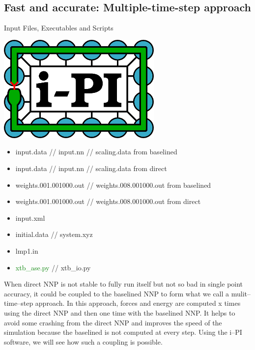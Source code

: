 \documentclass[12pt]{article}
\begin{document}
\subsection{Fast and accurate: Multiple-time-step approach}
\begin{mybox2}{{Input Files, Executables and Scripts}}
\begin{minipage}[c]{0.5\linewidth}
\includegraphics[scale=0.35]{ipi-logo-alpha.png} \\
\end{minipage}
\begin{minipage}[c]{0.5\linewidth}
\begin{itemize}
    \item input.data // input.nn // scaling.data from baselined
    \item input.data // input.nn // scaling.data from direct
    \item weights.001.001000.out // weights.008.001000.out from baselined
    \item weights.001.001000.out // weights.008.001000.out from direct
    \item input.xml
    \item initial.data // system.xyz
    \item lmp1.in
    \item \textcolor{green}{xtb\_ase.py} // xtb\_io.py
\end{itemize}
\end{minipage}
\end{mybox2}
When direct NNP is not stable to fully run itself but not so bad in single point accuracy, it could be coupled to the baselined NNP to form what we call a mulit--time--step approach. In this approach, forces and energy are computed x times using the direct NNP and then one time with the baselined NNP. It helps to avoid some crashing from the direct NNP and improves the speed of the simulation because the baselined is not computed at every step. Using the i--PI software, we will see how such a coupling is possible. 
\end{document}
